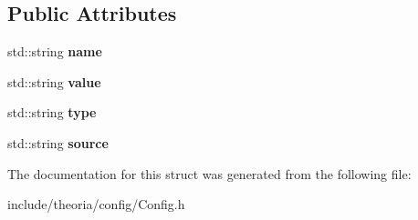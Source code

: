 \subsection*{Public Attributes}
\begin{DoxyCompactItemize}
\item 
\mbox{\label{structtheoria_1_1config_1_1Config_1_1Attr_ad39ea60695427392538c9b70631e3893}} 
std\+::string {\bfseries name}
\item 
\mbox{\label{structtheoria_1_1config_1_1Config_1_1Attr_a089f492d8f4a5ca06879bef7dfc178f0}} 
std\+::string {\bfseries value}
\item 
\mbox{\label{structtheoria_1_1config_1_1Config_1_1Attr_a6bb657b1e985b583434f46a868f02908}} 
std\+::string {\bfseries type}
\item 
\mbox{\label{structtheoria_1_1config_1_1Config_1_1Attr_aa2f90ed2b4db859ac6a83ec6b4d085e9}} 
std\+::string {\bfseries source}
\end{DoxyCompactItemize}


The documentation for this struct was generated from the following file\+:\begin{DoxyCompactItemize}
\item 
include/theoria/config/Config.\+h\end{DoxyCompactItemize}
